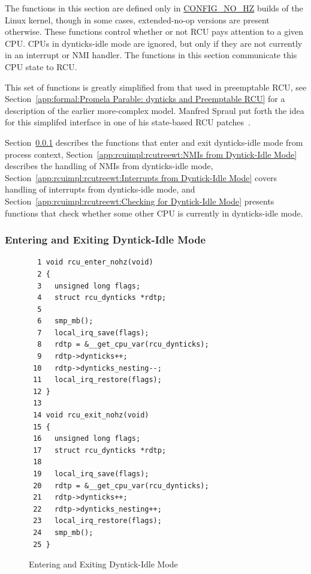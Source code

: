 The functions in this section are defined only in \url{CONFIG_NO_HZ}
builds of the Linux kernel,
though in some cases, extended-no-op versions are present otherwise.
These functions control whether or not RCU pays attention to a given CPU.
CPUs in dynticks-idle mode are ignored, but only if they are not
currently in an interrupt or NMI handler.
The functions in this section communicate this CPU state to RCU.

This set of functions is greatly simplified from that used in
preemptable RCU, see
Section~\ref{app:formal:Promela Parable: dynticks and Preemptable RCU}
for a description of the earlier more-complex model.
Manfred Spraul put forth the idea for this simplifed interface in
one of his state-based RCU
patches~\cite{ManfredSpraul2008StateMachineRCU,ManfredSpraul2008dyntickIRQNMI}.

Section~\ref{app:rcuimpl:rcutreewt:Entering and Exiting Dyntick-Idle Mode}
describes the functions that enter and exit dynticks-idle mode from
process context,
Section~\ref{app:rcuimpl:rcutreewt:NMIs from Dyntick-Idle Mode}
describes the handling of NMIs from dynticks-idle mode,
Section~\ref{app:rcuimpl:rcutreewt:Interrupts from Dyntick-Idle Mode}
covers handling of interrupts from dynticks-idle mode, and
Section~\ref{app:rcuimpl:rcutreewt:Checking for Dyntick-Idle Mode}
presents functions that check whether some other CPU is currently in
dynticks-idle mode.

\subsubsection{Entering and Exiting Dyntick-Idle Mode}
\label{app:rcuimpl:rcutreewt:Entering and Exiting Dyntick-Idle Mode}

\begin{figure}[tbp]
{ \scriptsize
\begin{verbatim}
  1 void rcu_enter_nohz(void)
  2 {
  3   unsigned long flags;
  4   struct rcu_dynticks *rdtp;
  5 
  6   smp_mb();
  7   local_irq_save(flags);
  8   rdtp = &__get_cpu_var(rcu_dynticks);
  9   rdtp->dynticks++;
 10   rdtp->dynticks_nesting--;
 11   local_irq_restore(flags);
 12 }
 13 
 14 void rcu_exit_nohz(void)
 15 {
 16   unsigned long flags;
 17   struct rcu_dynticks *rdtp;
 18 
 19   local_irq_save(flags);
 20   rdtp = &__get_cpu_var(rcu_dynticks);
 21   rdtp->dynticks++;
 22   rdtp->dynticks_nesting++;
 23   local_irq_restore(flags);
 24   smp_mb();
 25 }
\end{verbatim}
}
\caption{Entering and Exiting Dyntick-Idle Mode}
\label{fig:app:rcuimpl:rcutreewt:Entering and Exiting Dyntick-Idle Mode}
\end{figure}

